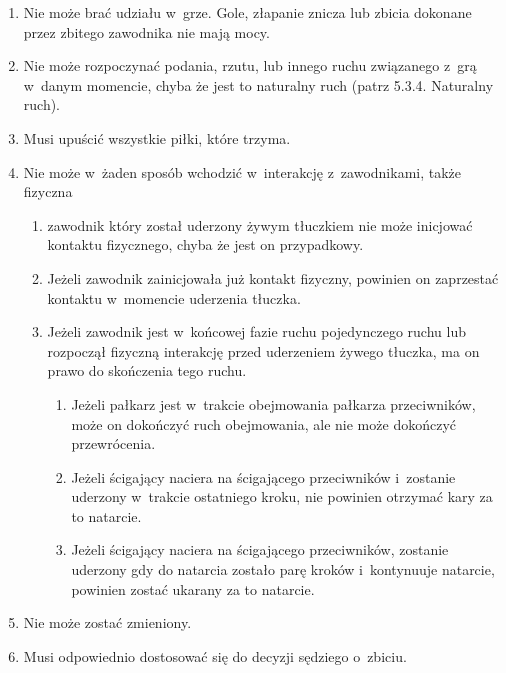 \documentclass[12pt]{article}
\begin{document}
\begin{enumerate}
	\item
	      Nie może brać udziału w~grze. Gole, złapanie znicza lub zbicia
	      dokonane przez zbitego zawodnika nie mają mocy.
	\item
	      Nie może rozpoczynać podania, rzutu, lub innego ruchu związanego z~grą
	      w~danym momencie, chyba że jest to naturalny ruch (patrz 5.3.4.
	      Naturalny ruch).
	\item
	      Musi upuścić wszystkie piłki, które trzyma.
	\item
	      Nie może w~żaden sposób wchodzić w~interakcję z~zawodnikami, także
	      fizyczna

	      \begin{enumerate}
		      \item
		            zawodnik który został uderzony żywym tłuczkiem nie może inicjować
		            kontaktu fizycznego, chyba że jest on przypadkowy.
		      \item
		            Jeżeli zawodnik zainicjowała już kontakt fizyczny, powinien on
		            zaprzestać kontaktu w~momencie uderzenia tłuczka.
		      \item
		            Jeżeli zawodnik jest w~końcowej fazie ruchu pojedynczego ruchu lub
		            rozpoczął fizyczną interakcję przed uderzeniem żywego tłuczka, ma on
		            prawo do skończenia tego ruchu.

		            \begin{enumerate}
			            \item
			                  Jeżeli pałkarz jest w~trakcie obejmowania pałkarza przeciwników,
			                  może on dokończyć ruch obejmowania, ale nie może dokończyć
			                  przewrócenia.
			            \item
			                  Jeżeli ścigający naciera na ścigającego przeciwników i~zostanie
			                  uderzony w~trakcie ostatniego kroku, nie powinien otrzymać kary za
			                  to natarcie.
			            \item
			                  Jeżeli ścigający naciera na ścigającego przeciwników, zostanie
			                  uderzony gdy do natarcia zostało parę kroków i~kontynuuje
			                  natarcie, powinien zostać ukarany za to natarcie.
		            \end{enumerate}
	      \end{enumerate}
	\item
	      Nie może zostać zmieniony.
	\item
	      Musi odpowiednio dostosować się do decyzji sędziego o~zbiciu.
\end{enumerate}
\end{document}
